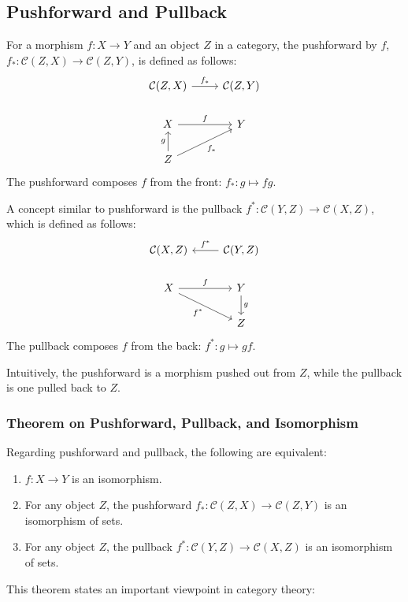 \documentclass[uplatex,a4j,12pt,dvipdfmx]{jsarticle}
\begin{document}
\subsection{Pushforward and Pullback}

For a morphism $f: X \to Y$ and an object $Z$ in a category, the pushforward by $f$, $f_{*} : \mathcal{C}(Z,X) \to \mathcal{C}(Z,Y)$, is defined as follows:
\[
\begin{tikzcd}
\mathcal{C}(Z,X) \arrow[r,"f_{*}"] & \mathcal{C}(Z,Y) \\
X \arrow[r,"f"] & Y \\
Z \arrow[u,"g"] \arrow[ur,"f_{*}"'] &
\end{tikzcd}
\]
The pushforward composes $f$ from the front: $f_{*} : g \mapsto fg$.

A concept similar to pushforward is the pullback $f^{*} :\mathcal{C}(Y,Z) \to \mathcal{C}(X,Z)$, which is defined as follows:
\[
\begin{tikzcd}
\mathcal{C}(X,Z) & \mathcal{C}(Y,Z) \arrow[l,"f^{*}"'] \\
X \arrow[r,"f"] \arrow[dr,"f^{*}"'] & Y \arrow[d,"g"] \\
& Z
\end{tikzcd}
\]
The pullback composes $f$ from the back: $f^{*} : g \mapsto gf$.

Intuitively, the pushforward is a morphism pushed out from $Z$, while the pullback is one pulled back to $Z$.

\subsubsection{Theorem on Pushforward, Pullback, and Isomorphism}

Regarding pushforward and pullback, the following are equivalent:

\begin{enumerate}
    \item $f : X \to Y$ is an isomorphism.
    \item For any object $Z$, the pushforward $f_{*} : \mathcal{C}(Z,X) \to \mathcal{C}(Z,Y)$ is an isomorphism of sets.
    \item For any object $Z$, the pullback $f^{*} :\mathcal{C}(Y,Z) \to \mathcal{C}(X,Z)$ is an isomorphism of sets.
\end{enumerate}

This theorem states an important viewpoint in category theory:

\begin{center}
\end{center}
\end{document}
